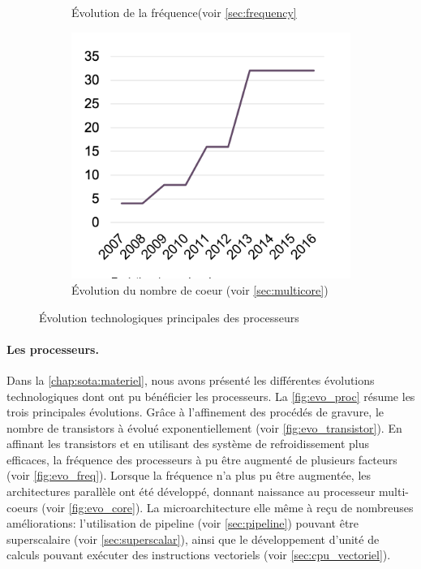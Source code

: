 \begin{figure}[t!]
\begin{subfigure}[t]{0.33\textwidth}
                \caption{\label{fig:evo_freq}Évolution de la fréquence(voir \autoref{sec:frequency}}
            \end{subfigure}\hfill
            \begin{subfigure}[t]{0.33\textwidth}
                    \centering
                    \includegraphics[width=\linewidth]{images/evo_core.png}
                    \caption{\label{fig:evo_core}Évolution du nombre de coeur (voir \autoref{sec:multicore})}
            \end{subfigure}
            \caption{\label{fig:evo_proc}Évolution technologiques principales des processeurs}
        \end{figure}
        
        \paragraph{Les processeurs.} Dans la \autoref{chap:sota:materiel}, nous avons présenté les différentes évolutions technologiques dont ont pu bénéficier les processeurs. La \autoref{fig:evo_proc} résume les trois principales évolutions.
        Grâce à l'affinement des procédés de gravure, le nombre de transistors à évolué exponentiellement (voir \autoref{fig:evo_transistor}).  
        En affinant les transistors et en utilisant des système de refroidissement plus efficaces, la fréquence des processeurs à pu être augmenté de plusieurs facteurs (voir \autoref{fig:evo_freq}).
        Lorsque la fréquence n'a plus pu être augmentée, les architectures parallèle ont été développé, donnant naissance au processeur multi-coeurs (voir \autoref{fig:evo_core}). La microarchitecture elle même à reçu de nombreuses améliorations: l'utilisation de pipeline (voir \autoref{sec:pipeline}) pouvant être superscalaire (voir \autoref{sec:superscalar}), ainsi que le développement d'unité de calculs pouvant exécuter des instructions vectoriels (voir \autoref{sec:cpu_vectoriel}).
            
